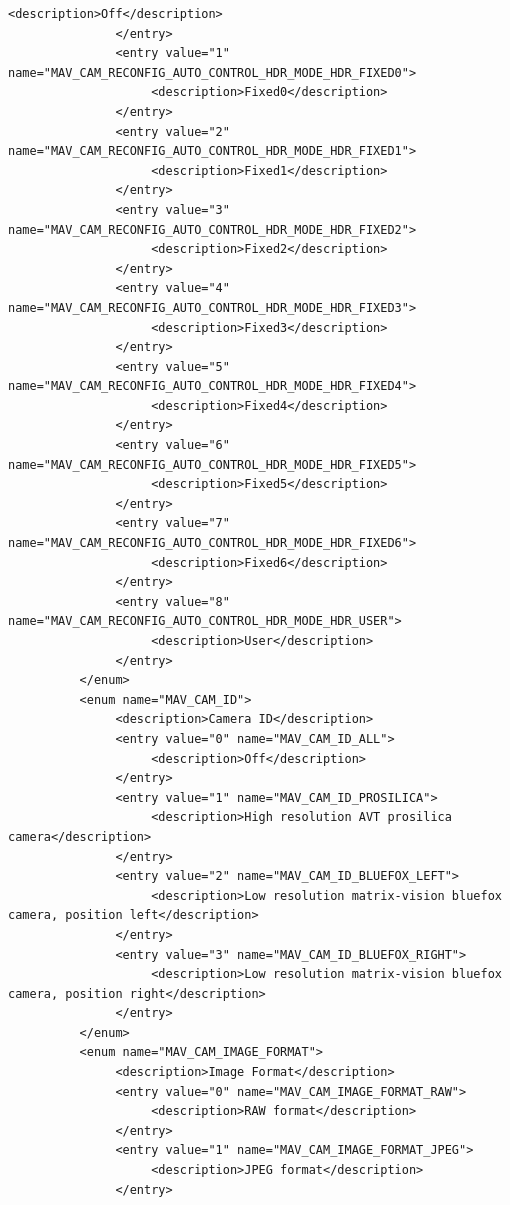 \begin{lstlisting}[captionpos=b, caption="Definition of \textsc{Skye} specific Mavlink messages", label=app_xml]
                    <description>Off</description>
               </entry>
               <entry value="1" name="MAV_CAM_RECONFIG_AUTO_CONTROL_HDR_MODE_HDR_FIXED0">
                    <description>Fixed0</description>
               </entry>
               <entry value="2" name="MAV_CAM_RECONFIG_AUTO_CONTROL_HDR_MODE_HDR_FIXED1">
                    <description>Fixed1</description>
               </entry>
               <entry value="3" name="MAV_CAM_RECONFIG_AUTO_CONTROL_HDR_MODE_HDR_FIXED2">
                    <description>Fixed2</description>
               </entry>
               <entry value="4" name="MAV_CAM_RECONFIG_AUTO_CONTROL_HDR_MODE_HDR_FIXED3">
                    <description>Fixed3</description>
               </entry>
               <entry value="5" name="MAV_CAM_RECONFIG_AUTO_CONTROL_HDR_MODE_HDR_FIXED4">
                    <description>Fixed4</description>
               </entry>
               <entry value="6" name="MAV_CAM_RECONFIG_AUTO_CONTROL_HDR_MODE_HDR_FIXED5">
                    <description>Fixed5</description>
               </entry>
               <entry value="7" name="MAV_CAM_RECONFIG_AUTO_CONTROL_HDR_MODE_HDR_FIXED6">
                    <description>Fixed6</description>
               </entry>
               <entry value="8" name="MAV_CAM_RECONFIG_AUTO_CONTROL_HDR_MODE_HDR_USER">
                    <description>User</description>
               </entry>
          </enum>
          <enum name="MAV_CAM_ID">
               <description>Camera ID</description>
               <entry value="0" name="MAV_CAM_ID_ALL">
                    <description>Off</description>
               </entry>
               <entry value="1" name="MAV_CAM_ID_PROSILICA">
                    <description>High resolution AVT prosilica camera</description>
               </entry>
               <entry value="2" name="MAV_CAM_ID_BLUEFOX_LEFT">
                    <description>Low resolution matrix-vision bluefox camera, position left</description>
               </entry>
               <entry value="3" name="MAV_CAM_ID_BLUEFOX_RIGHT">
                    <description>Low resolution matrix-vision bluefox camera, position right</description>
               </entry>
          </enum>
          <enum name="MAV_CAM_IMAGE_FORMAT">
               <description>Image Format</description>
               <entry value="0" name="MAV_CAM_IMAGE_FORMAT_RAW">
                    <description>RAW format</description>
               </entry>
               <entry value="1" name="MAV_CAM_IMAGE_FORMAT_JPEG">
                    <description>JPEG format</description>
               </entry>

\end{lstlisting}
